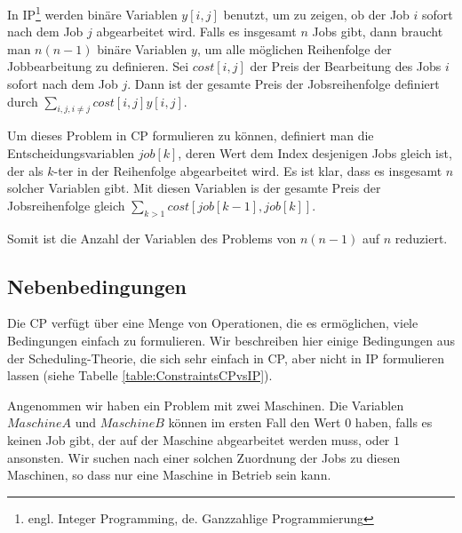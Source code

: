 In IP\footnote{engl. Integer Programming, de. Ganzzahlige Programmierung} werden binäre Variablen $y[i,j]$ benutzt, um zu zeigen, ob der Job $i$ sofort nach dem Job $j$ abgearbeitet wird. Falls es insgesamt $n$ Jobs gibt, dann braucht man $n(n-1)$ binäre Variablen $y$, um alle möglichen Reihenfolge der Jobbearbeitung zu definieren. Sei $cost[i,j]$ der Preis der Bearbeitung des Jobs $i$ sofort nach dem Job $j$. Dann ist der gesamte Preis der Jobsreihenfolge definiert durch $\sum_{i,j,i\not =  j} {cost[i,j]y[i,j]}$.

Um dieses Problem in CP formulieren zu können, definiert man die Entscheidungsvariablen $job[k]$, deren Wert dem Index desjenigen Jobs gleich ist, der als $k$-ter in der Reihenfolge abgearbeitet wird. Es ist klar, dass es insgesamt $n$ solcher Variablen gibt. Mit diesen Variablen is der gesamte Preis der Jobsreihenfolge gleich $\sum_{k>1} {cost[job[k-1],job[k]]}$.

Somit ist die Anzahl der Variablen des Problems von $n(n-1)$ auf $n$ reduziert.

\subsection{Nebenbedingungen}

Die CP verfügt über eine Menge von Operationen, die es ermöglichen, viele Bedingungen einfach zu formulieren. Wir beschreiben hier einige Bedingungen aus der Scheduling-Theorie, die sich sehr einfach in CP, aber nicht in IP formulieren lassen (siehe Tabelle \ref{table:ConstraintsCPvsIP}).

Angenommen wir haben ein Problem mit zwei Maschinen. Die Variablen $MaschineA$ und $MaschineB$ können im ersten Fall den Wert $0$ haben, falls es keinen Job gibt, der auf der Maschine abgearbeitet werden muss, oder $1$ ansonsten. Wir suchen nach einer solchen Zuordnung der Jobs zu diesen Maschinen, so dass nur eine Maschine in Betrieb sein kann. 

